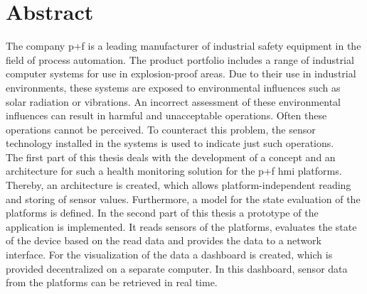 \chapter*{Abstract}
The company \ac{p+f} is a leading manufacturer of industrial safety equipment in the field of process automation. The product portfolio includes a range of industrial computer systems for use in explosion-proof areas. Due to their use in industrial environments, these systems are exposed to environmental influences such as solar radiation or vibrations. An incorrect assessment of these environmental influences can result in harmful and unacceptable operations. Often these operations cannot be perceived. To counteract this problem, the sensor technology installed in the systems is used to indicate just such operations.\\
The first part of this thesis deals with the development of a concept and an architecture for such a health monitoring solution for the \acl{p+f} \ac{hmi} platforms. Thereby, an architecture is created, which allows platform-independent reading and storing of sensor values. Furthermore, a model for the state evaluation of the platforms is defined.
In the second part of this thesis a prototype of the application is implemented. It reads sensors of the platforms, evaluates the state of the device based on the read data and provides the data to a network interface.
For the visualization of the data a dashboard is created, which is provided decentralized on a separate computer. In this dashboard, sensor data from the platforms can be retrieved in real time.